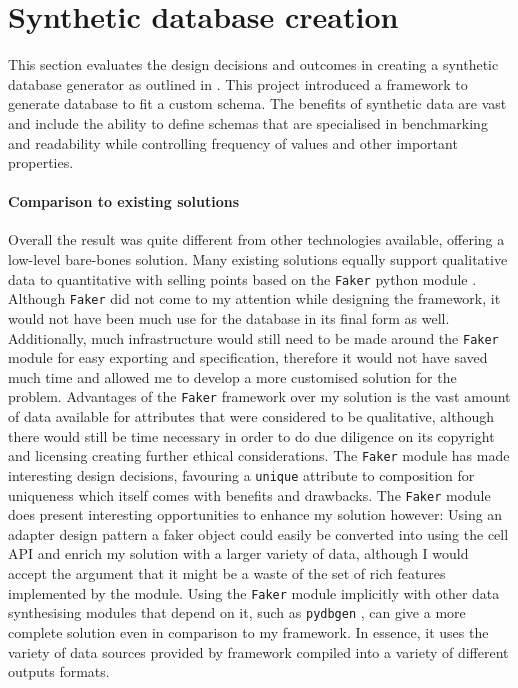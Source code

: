 \section{Synthetic database creation}\label{sec:evaluation:syntheticdatabase}
This section evaluates the design decisions and outcomes in creating a synthetic
database generator as outlined in . This
project introduced a framework to generate database to fit a custom schema. The
benefits of synthetic data are vast and include the ability to define schemas
that are specialised in benchmarking and readability while controlling frequency
of values and other important properties.

\paragraph{Comparison to existing solutions} Overall the result was quite different from other technologies available,
offering a low-level bare-bones solution. Many existing solutions equally support
qualitative data to quantitative with selling points based on the
\lstinline{Faker} python module \cite{Faker}. Although \lstinline{Faker} did not come to my
attention while designing the framework, it would not have been much use for the
 database in its final form as well. Additionally, much
infrastructure would still need to be made around the \lstinline{Faker} module
for easy exporting and specification, therefore it would not have saved much
time and allowed me to develop a more customised solution for the problem.
Advantages of the \lstinline{Faker} framework over my solution is the vast
amount of data available for attributes that were considered to be qualitative,
although there would still be time necessary in order to do due diligence on its
copyright and licensing creating further ethical considerations. The \lstinline{Faker} module has made interesting
design decisions, favouring a \lstinline{unique} attribute to composition for
uniqueness which itself comes with benefits and drawbacks. The \lstinline{Faker}
module does present interesting opportunities to enhance my solution however:
Using an adapter design pattern a faker object could easily be converted into
using the cell API and enrich my solution with a larger variety of data,
although I would accept the argument that it might be a waste of the set of rich
features implemented by the module. Using the \lstinline{Faker} module implicitly
with other data synthesising modules that depend on
it, such as \lstinline{pydbgen} \cite{pydbgen}, can give a more complete solution even in
comparison to my framework. In essence, it uses the variety of data sources
provided by framework compiled into a variety of different outputs formats.

